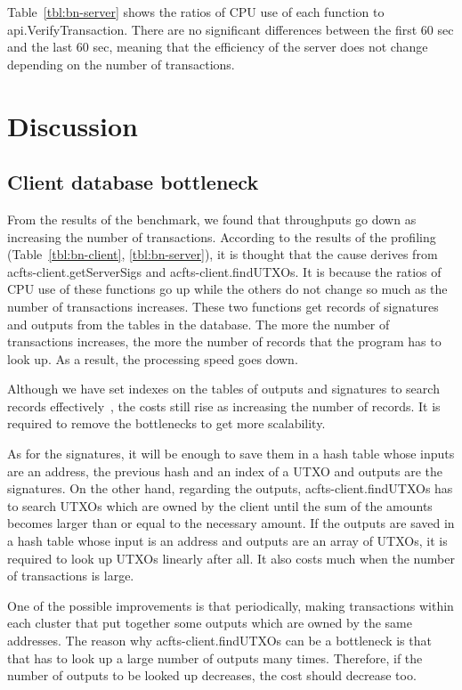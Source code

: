 \documentclass[a4paper, oneside]{discothesis}
\begin{document}
Table~\ref{tbl:bn-server} shows the ratios of CPU use of each function to api.VerifyTransaction.
There are no significant differences between the first 60 sec and the last 60 sec,
meaning that the efficiency of the server does not change
depending on the number of transactions.

\section{Discussion}

\subsection{Client database bottleneck}
From the results of the benchmark, we found that throughputs go down
as increasing the number of transactions.
According to the results of the profiling (Table~\ref{tbl:bn-client}, \ref{tbl:bn-server}),
it is thought that the cause derives from acfts-client.getServerSigs and acfts-client.findUTXOs.
It is because the ratios of CPU use of these functions go up
while the others do not change so much as the number of transactions increases.
These two functions get records of signatures and outputs from the tables in the database.
The more the number of transactions increases,
the more the number of records that the program has to look up.
As a result, the processing speed goes down.

Although we have set indexes on the tables of outputs and signatures
to search records effectively~\cite{mysql, multiple},
the costs still rise as increasing the number of records.
It is required to remove the bottlenecks to get more scalability.

As for the signatures, it will be enough to save them in a hash table whose inputs are
an address, the previous hash and an index of a UTXO and outputs are the signatures.
On the other hand, regarding the outputs, acfts-client.findUTXOs has to search UTXOs
which are owned by the client until the sum of the amounts becomes larger than or equal to
the necessary amount.
If the outputs are saved in a hash table whose input is an address and outputs are
an array of UTXOs, it is required to look up UTXOs linearly after all.
It also costs much when the number of transactions is large.

One of the possible improvements is that periodically, making transactions
within each cluster that put together some outputs which are owned by the same addresses.
The reason why acfts-client.findUTXOs can be a bottleneck is that that has to
look up a large number of outputs many times.
Therefore, if the number of outputs to be looked up decreases, the cost should decrease too.
\end{document}
